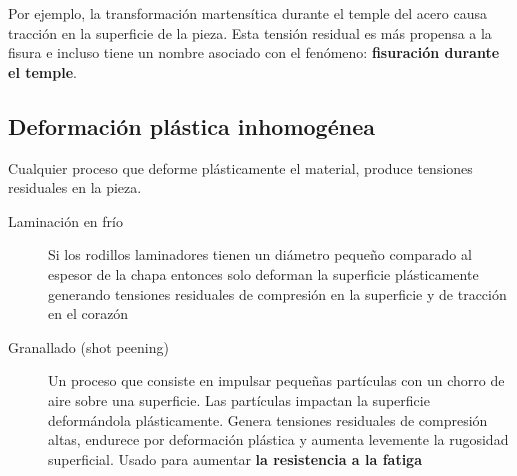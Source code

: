 Por ejemplo, la transformación martensítica durante el temple del acero causa tracción en la superficie de la pieza. Esta tensión residual es más propensa a la fisura e incluso tiene un nombre asociado con el fenómeno: \textbf{fisuración durante el temple}.

\subsection{Deformación plástica inhomogénea}

Cualquier proceso que deforme plásticamente el material, produce tensiones residuales en la pieza.

\begin{description}
	\item[Laminación en frío] Si los rodillos laminadores tienen un diámetro pequeño comparado al espesor de la chapa entonces solo deforman la superficie plásticamente generando tensiones residuales de compresión en la superficie y de tracción en el corazón
	\item[Granallado (shot peening)] Un proceso que consiste en impulsar pequeñas partículas con un chorro de aire sobre una superficie. Las partículas impactan la superficie deformándola plásticamente. Genera tensiones residuales de compresión altas, endurece por deformación plástica y aumenta levemente la rugosidad superficial. Usado para aumentar \textbf{la resistencia a la fatiga }
\end{description}






